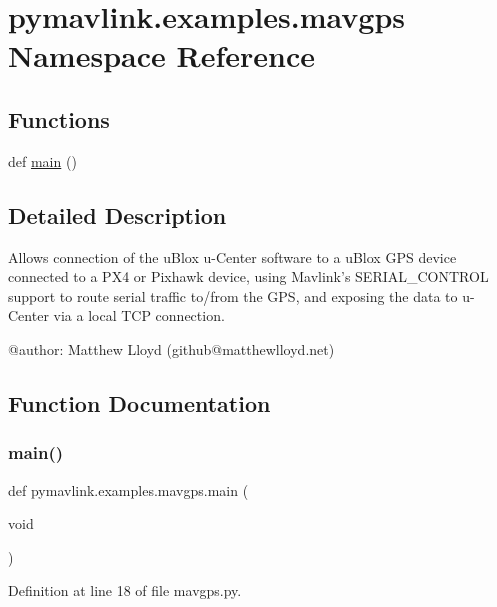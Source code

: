 \hypertarget{namespacepymavlink_1_1examples_1_1mavgps}{}\section{pymavlink.\+examples.\+mavgps Namespace Reference}
\label{namespacepymavlink_1_1examples_1_1mavgps}
\subsection*{Functions}
\begin{DoxyCompactItemize}
\item 
def \mbox{\hyperlink{namespacepymavlink_1_1examples_1_1mavgps_a344a6c39657f3fd2f8a6053272a313a0}{main}} ()
\end{DoxyCompactItemize}


\subsection{Detailed Description}
\begin{DoxyVerb}Allows connection of the uBlox u-Center software to
a uBlox GPS device connected to a PX4 or Pixhawk device,
using Mavlink's SERIAL_CONTROL support to route serial
traffic to/from the GPS, and exposing the data to u-Center
via a local TCP connection.

@author: Matthew Lloyd (github@matthewlloyd.net)
\end{DoxyVerb}
 

\subsection{Function Documentation}
\mbox{\label{namespacepymavlink_1_1examples_1_1mavgps_a344a6c39657f3fd2f8a6053272a313a0}} 
\subsubsection{\texorpdfstring{main()}{main()}}
{\footnotesize\ttfamily def pymavlink.\+examples.\+mavgps.\+main (\begin{DoxyParamCaption}\item[{void}]{ }\end{DoxyParamCaption})}



Definition at line 18 of file mavgps.\+py.

